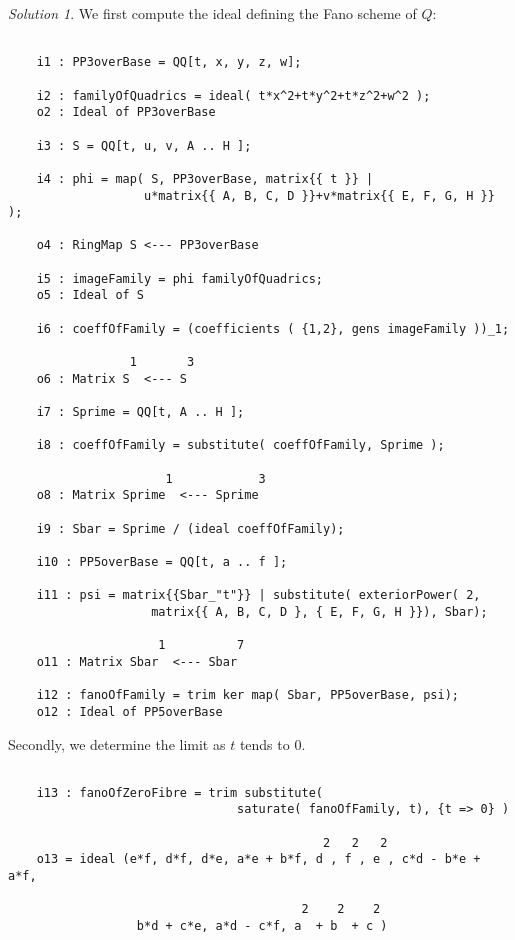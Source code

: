 \documentclass[12pt,noamsfonts]{amsart}
\theoremstyle{definition}
\theoremstyle{remark}
\newtheorem*{solution}{Solution}
\begin{document}
\begin{solution}
We first compute the ideal defining the Fano scheme of $Q$:
{\scriptsize
\begin{verbatim}

    i1 : PP3overBase = QQ[t, x, y, z, w];

    i2 : familyOfQuadrics = ideal( t*x^2+t*y^2+t*z^2+w^2 );
    o2 : Ideal of PP3overBase

    i3 : S = QQ[t, u, v, A .. H ];

    i4 : phi = map( S, PP3overBase, matrix{{ t }} | 
                   u*matrix{{ A, B, C, D }}+v*matrix{{ E, F, G, H }} );
     
    o4 : RingMap S <--- PP3overBase

    i5 : imageFamily = phi familyOfQuadrics;
    o5 : Ideal of S

    i6 : coeffOfFamily = (coefficients ( {1,2}, gens imageFamily ))_1;

                 1       3
    o6 : Matrix S  <--- S

    i7 : Sprime = QQ[t, A .. H ];

    i8 : coeffOfFamily = substitute( coeffOfFamily, Sprime );

                      1            3
    o8 : Matrix Sprime  <--- Sprime

    i9 : Sbar = Sprime / (ideal coeffOfFamily);

    i10 : PP5overBase = QQ[t, a .. f ];

    i11 : psi = matrix{{Sbar_"t"}} | substitute( exteriorPower( 2, 
                    matrix{{ A, B, C, D }, { E, F, G, H }}), Sbar);

                     1          7
    o11 : Matrix Sbar  <--- Sbar
    
    i12 : fanoOfFamily = trim ker map( Sbar, PP5overBase, psi);
    o12 : Ideal of PP5overBase

\end{verbatim}}
Secondly, we determine the limit as $t$ tends to $0$.  
{\scriptsize
\begin{verbatim}    

    i13 : fanoOfZeroFibre = trim substitute( 
                                saturate( fanoOfFamily, t), {t => 0} )
    
                                            2   2   2
    o13 = ideal (e*f, d*f, d*e, a*e + b*f, d , f , e , c*d - b*e + a*f, 

                                         2    2    2
                  b*d + c*e, a*d - c*f, a  + b  + c )


\end{verbatim}}
\end{solution}
\end{document}

